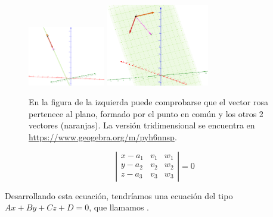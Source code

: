 \begin{figure}[hptb]
    \centering
    \includegraphics[width=0.3\textwidth]{img/Implicita1.PNG}
    \includegraphics[width=0.4\textwidth]{img/Implicita2.PNG}
    \caption{En la figura de la izquierda puede comprobarse que el vector rosa pertenece al plano, formado por el punto en común y los otros 2 vectores (naranjas). La versión tridimensional se encuentra en \href{https://www.geogebra.org/m/pyh6nnsp}{https://www.geogebra.org/m/pyh6nnsp}.}
    \label{fig::ecuacion_implicita_plano}
\end{figure}

\[
\left|
\begin{array}{ccc} 
x - a_1 & v_1 & w_1\\
y - a_2 & v_2 & w_2 \\ 
z - a_3 & v_3 & w_3 
\end{array}\right| = 0
\]

Desarrollando esta ecuación, tendríamos una ecuación del tipo $Ax+By+Cz + D = 0$, que llamamos .



